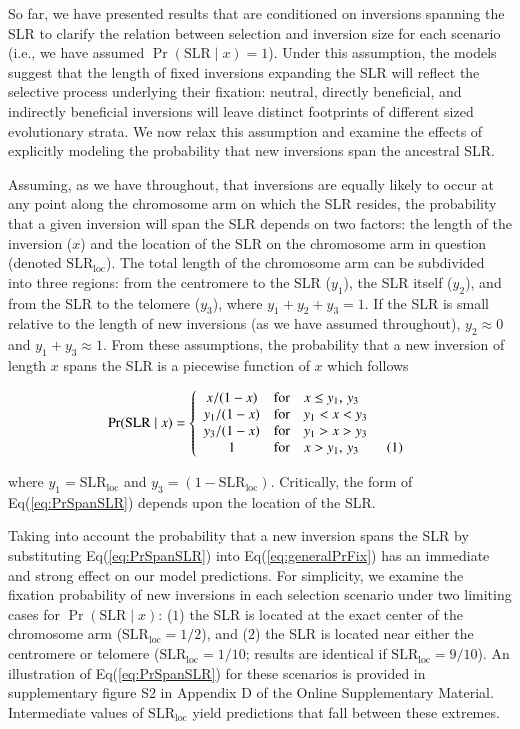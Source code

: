 \documentclass{article}[12pt]
\newcommand\numberthis{\addtocounter{equation}{1}\tag{\theequation}}
\begin{document}
So far, we have presented results that are conditioned on inversions spanning the SLR to clarify the relation between selection and inversion size for each scenario (i.e., we have assumed $\Pr(\text{SLR} \mid x) = 1$). Under this assumption, the models suggest that the length of fixed inversions expanding the SLR will reflect the selective process underlying their fixation: neutral, directly beneficial, and indirectly beneficial inversions will leave distinct footprints of different sized evolutionary strata. We now relax this assumption and examine the effects of explicitly modeling the probability that new inversions span the ancestral SLR.

Assuming, as we have throughout, that inversions are equally likely to occur at any point along the chromosome arm on which the SLR resides, the probability that a given inversion will span the SLR depends on two factors: the length of the inversion ($x$) and the location of the SLR on the chromosome arm in question (denoted $\text{SLR}_{\text{loc}}$). The total length of the chromosome arm can be subdivided into three regions: from the centromere to the SLR ($y_1$), the SLR itself ($y_2$), and from the SLR to the telomere ($y_3$), where $y_1 + y_2 + y_3 = 1$. If the SLR is small relative to the length of new inversions (as we have assumed throughout), $y_2 \approx 0$ and $y_1 + y_3 \approx 1$. From these assumptions, the probability that a new inversion of length $x$ spans the SLR is a piecewise function of $x$ which follows

\begin{equation}\label{eq:PrSpanSLR}
	\Pr(\text{SLR} \mid x) = \left\{ 
		\begin{array}{ccl} 
			x  /(1 - x) & \mbox{for} & x \leq y_1,\,y_3 \\
			y_1/(1 - x) & \mbox{for} & y_1 < x < y_3 \\ 
			y_3/(1 - x) & \mbox{for} & y_1 > x > y_3 \\ 
			1 & \mbox{for} & x > y_1,\,y_3 \numberthis			
		\end{array}\right.
\end{equation}

\noindent where $y_1 = \text{SLR}_{\text{loc}}$ and $y_3 = (1 - \text{SLR}_{\text{loc}})$. Critically, the form of Eq(\ref{eq:PrSpanSLR}) depends upon the location of the SLR. 

Taking into account the probability that a new inversion spans the SLR by substituting Eq(\ref{eq:PrSpanSLR}) into Eq(\ref{eq:generalPrFix}) has an immediate and strong effect on our model predictions. For simplicity, we examine the fixation probability of new inversions in each selection scenario under two limiting cases for $\Pr(\text{SLR} \mid x)$: ($1$) the SLR is located at the exact center of the chromosome arm ($\text{SLR}_{\text{loc}} = 1/2$), and ($2$) the SLR is located near either the centromere or telomere ($\text{SLR}_{\text{loc}} = 1/10$; results are identical if $\text{SLR}_{\text{loc}} = 9/10$). An illustration of Eq(\ref{eq:PrSpanSLR}) for these scenarios is provided in supplementary figure S2 in Appendix D of the Online Supplementary Material. Intermediate values of $\text{SLR}_{\text{loc}}$ yield predictions that fall between these extremes. 
\end{document}
